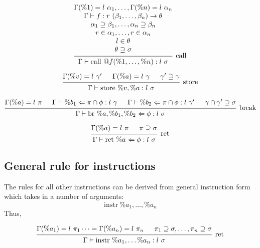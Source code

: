 \documentclass{article}
\begin{document}
\[
\begin{prooftree}
    \hypo{
        \begin{matrix}
        \Gamma(\%1) = l\ \alpha_1, \dots, \Gamma(\%n) = l\ \alpha_n \\
        \Gamma \vdash f : r\ (\beta_1, \dots, \beta_n) \rightarrow \theta \\ 
        \alpha_1 \supseteq \beta_1, \dots, \alpha_n \supseteq \beta_n \\
        r \in \alpha_1, \dots, r \in \alpha_n \\
        l \in \theta \\
        \theta \supseteq \sigma 
        \end{matrix}
    }
    \infer1[call]{\Gamma \vdash \text{call } @f(\%1, \dots, \%n) : l\ \sigma}
\end{prooftree}
\]

\[
\begin{prooftree}
    \hypo{\Gamma(\%v) = l\ \gamma'}
    \hypo{\Gamma(\%a) = l\ \gamma}
    \hypo{\gamma' \supseteq \gamma}
    \infer3[store]{\Gamma \vdash \text{store }\%v, \%a : l\ \sigma}
\end{prooftree}
\]

\[
\begin{prooftree}
    \hypo{\Gamma(\%a) = l\ \pi}
    \hypo{\Gamma \vdash \%b_1 \Leftarrow \pi \cap \phi : l\ \gamma} 
    \hypo{\Gamma \vdash \%b_2 \Leftarrow \pi \cap \phi : l\ \gamma'} 
    \hypo{\gamma \cap \gamma' \supseteq \sigma}
    \infer4[break]{\Gamma \vdash \text{br }\%a, \%b_1, \%b_2 \Leftarrow \phi : l\ \sigma}
\end{prooftree}
\]




\[
\begin{prooftree}
    \hypo{\Gamma(\%a) = l\ \pi}
    \hypo{\pi \supseteq \sigma}
    \infer2[ret]{\Gamma \vdash \text{ret }\%a \Leftarrow \phi : l\ \sigma}
\end{prooftree}
\]

\subsection{General rule for instructions}

The rules for all other instructions
can be derived from general instruction form which takes in
a number of arguments:
$$\text{instr}\ \%a_1, \dots, \%a_n$$
Thus,

\[
\begin{prooftree}
    \hypo{\Gamma(\%a_1) = l\ \pi_1 \dots = \Gamma(\%a_n) = l\ \pi_n}
    \hypo{\pi_1 \supseteq \sigma, \dots, \pi_n \supseteq \sigma}
    \infer2[ret]{\Gamma \vdash \text{instr}\ \%a_1, \dots \%a_n : l\ \sigma}
\end{prooftree}
\]
\end{document}
